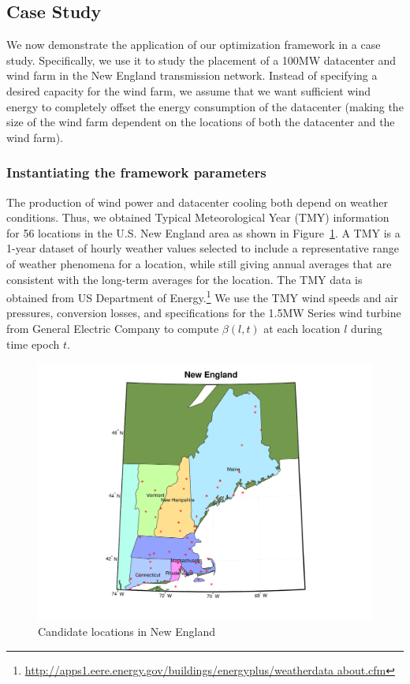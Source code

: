 \subsection{Case Study}
\label{sec:eval}

We now demonstrate the application of our optimization framework in a
case study.  Specifically, we use it to study the placement of a 100MW
datacenter and wind farm in the New England transmission network.
Instead of specifying a desired capacity for the wind farm, we assume
that we want sufficient wind energy to completely offset the energy
consumption of the datacenter (making the size of the wind farm
dependent on the locations of both the datacenter and the wind farm).

\subsubsection{Instantiating the framework parameters}

The production of wind power and datacenter cooling both depend on weather conditions.  Thus, we obtained Typical Meteorological Year (TMY) information for 56 locations in the U.S. New England area as shown in Figure~\ref{fig:NE_locs}.  A TMY is a 1-year dataset of hourly weather values selected to include a representative range of weather phenomena for a location, while still giving annual averages that are consistent with the long-term averages for the location.  The TMY data is obtained from US Department of Energy.\footnote{\url{http://apps1.eere.energy.gov/buildings/energyplus/weatherdata about.cfm}} We use the TMY wind speeds and air pressures, conversion losses, and specifications for the 1.5MW Series wind turbine from General Electric Company \cite{GE15MW} to compute $\beta(l,t)$ at each location $l$ during time epoch $t$.

\begin{figure}[ht]
\centering
\includegraphics[width=1\columnwidth]{img/NE_map}
\caption{Candidate locations in New England}
\label{fig:NE_locs}
\end{figure}

